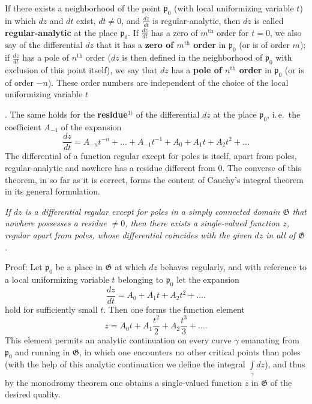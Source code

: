 \documentclass{article}
\begin{document}
If there exists a neighborhood of the point $\mathfrak{p}_0$ (with local uniformizing variable $t$) in which $dz$ and $dt$ exist, $dt \neq 0$, and $\frac{dz}{dt}$ is regular-analytic, then $dz$ is called \textbf{regular-analytic} at the place $\mathfrak{p}_0$. If $\frac{dz}{dt}$ has a zero of $m^{\text{th}}$ order for $t = 0$, we also say of the differential $dz$ that it has a \textbf{zero of $m^{\text{th}}$ order} in $\mathfrak{p}_0$ (or is of order $m$); if $\frac{dz}{dt}$ has a pole of $n^{\text{th}}$ order ($dz$ is then defined in the neighborhood of $\mathfrak{p}_0$ with exclusion of this point itself), we say that $dz$ has a \textbf{pole of $n^{\text{th}}$ order} in $\mathfrak{p}_0$ (or is of order $-n$). These order numbers are independent of the choice of the local uniformizing variable $t$

. The same holds for the \textbf{residue}${}^{1)}$ of the differential $dz$ at the place $\mathfrak{p}_0$, i.\,e.\ the coefficient $A_{-1}$ of the expansion
\[ \frac{dz}{dt} = A_{-n} t^{-n} + \dots + A_{-1} t^{-1} + A_0 + A_1 t + A_2 t^2 + \dots \]
The differential of a function regular except for poles is itself, apart from poles, regular-analytic and nowhere has a residue different from $0$. The converse of this theorem, in so far as it is correct, forms the content of Cauchy's integral theorem in its general formulation.

\emph{If $dz$ is a differential regular except for poles in a simply connected domain $\mathfrak{G}$ that nowhere possesses a residue $\neq 0$, then there exists a single-valued function $z$, regular apart from poles, whose differential coincides with the given $dz$ in all of $\mathfrak{G}$.}

Proof: Let $\mathfrak{p}_0$ be a place in $\mathfrak{G}$ at which $dz$ behaves regularly, and with reference to a local uniformizing variable $t$ belonging to $\mathfrak{p}_0$ let the expansion
\[ \frac{dz}{dt} = A_0 + A_1 t + A_2 t^2 + \dots. \]
hold for sufficiently small $t$. Then one forms the function element
\[ z = A_0 t + A_1 \frac{t^2}{2} + A_2 \frac{t^3}{3} + \dots. \]
This element permits an analytic continuation on every curve $\gamma$ emanating from $\mathfrak{p}_0$ and running in $\mathfrak{G}$, in which one encounters no other critical points than poles (with the help of this analytic continuation we define the integral $\displaystyle\int\limits_\gamma dz$), and thus by the monodromy theorem one obtains a single-valued function $z$ in $\mathfrak{G}$ of the desired quality.
\end{document}
